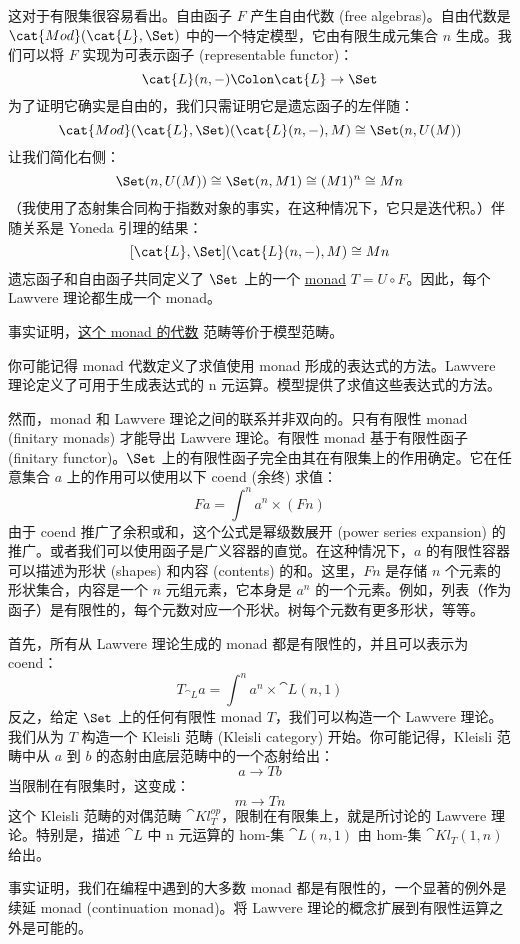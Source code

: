 这对于有限集很容易看出。自由函子 $F$ 产生自由代数 (free algebras)。自由代数是 $\cat{Mod}(\cat{L}, \Set)$ 中的一个特定模型，它由有限生成元集合 $n$ 生成。我们可以将 $F$ 实现为可表示函子 (representable functor)：
\[\cat{L}(n, -) \Colon \cat{L} \to \Set\]
为了证明它确实是自由的，我们只需证明它是遗忘函子的左伴随：
\[\cat{Mod}(\cat{L}, \Set)(\cat{L}(n, -), M) \cong \Set(n, U(M))\]
让我们简化右侧：
\[\Set(n, U(M)) \cong \Set(n, M 1) \cong (M 1)^n \cong M n\]
（我使用了态射集合同构于指数对象的事实，在这种情况下，它只是迭代积。）伴随关系是 Yoneda 引理的结果：
\[[\cat{L}, \Set](\cat{L}(n, -), M) \cong M n\]
遗忘函子和自由函子共同定义了 $\Set$ 上的一个 \hyperref[monads-categorically]{monad} $T = U \circ F$。因此，每个 Lawvere 理论都生成一个 monad。

事实证明，\hyperref[algebras-for-monads]{这个 monad 的代数} 范畴等价于模型范畴。

你可能记得 monad 代数定义了求值使用 monad 形成的表达式的方法。Lawvere 理论定义了可用于生成表达式的 n 元运算。模型提供了求值这些表达式的方法。

然而，monad 和 Lawvere 理论之间的联系并非双向的。只有有限性 monad (finitary monads) 才能导出 Lawvere 理论。有限性 monad 基于有限性函子 (finitary functor)。$\Set$ 上的有限性函子完全由其在有限集上的作用确定。它在任意集合 $a$ 上的作用可以使用以下 coend (余终) 求值：
\[F a = \int^n a^n \times (F n)\]
由于 coend 推广了余积或和，这个公式是幂级数展开 (power series expansion) 的推广。或者我们可以使用函子是广义容器的直觉。在这种情况下，$a$ 的有限性容器可以描述为形状 (shapes) 和内容 (contents) 的和。这里，$F n$ 是存储 $n$ 个元素的形状集合，内容是一个 $n$ 元组元素，它本身是 $a^n$ 的一个元素。例如，列表（作为函子）是有限性的，每个元数对应一个形状。树每个元数有更多形状，等等。

首先，所有从 Lawvere 理论生成的 monad 都是有限性的，并且可以表示为 coend：
\[T_{\cat{L}} a = \int^n a^n \times \cat{L}(n, 1)\]
反之，给定 $\Set$ 上的任何有限性 monad $T$，我们可以构造一个 Lawvere 理论。我们从为 $T$ 构造一个 Kleisli 范畴 (Kleisli category) 开始。你可能记得，Kleisli 范畴中从 $a$ 到 $b$ 的态射由底层范畴中的一个态射给出：
\[a \to T b\]
当限制在有限集时，这变成：
\[m \to T n\]
这个 Kleisli 范畴的对偶范畴 $\cat{Kl}^\mathit{op}_{T}$，限制在有限集上，就是所讨论的 Lawvere 理论。特别是，描述 $\cat{L}$ 中 n 元运算的 hom-集 $\cat{L}(n, 1)$ 由 hom-集 $\cat{Kl}_{T}(1, n)$ 给出。

事实证明，我们在编程中遇到的大多数 monad 都是有限性的，一个显著的例外是续延 monad (continuation monad)。将 Lawvere 理论的概念扩展到有限性运算之外是可能的。

